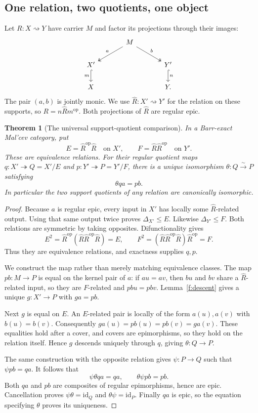\documentclass[11pt]{article}
\newtheorem{theorem}{Theorem}[section]
\theoremstyle{definition}
\theoremstyle{remark}\newtheorem{remark}[theorem]{Remark}
\newcommand{\id}{\mathrm{id}}
\newcommand{\iso}{\xrightarrow{\sim}}
\begin{document}
\subsection{One relation, two quotients, one object}

Let $R:X\rightsquigarrow Y$ have carrier $M$ and factor its projections
through their images:
\[
\begin{tikzcd}[column sep=large]
&M \arrow[dl,two heads,"a"'] \arrow[dr,two heads,"b"]&\\
X' \arrow[d,hook,"m"'] &&Y' \arrow[d,hook,"n"]\\
X&&Y.
\end{tikzcd}
\]
The pair $(a,b)$ is jointly monic. We use $\widehat R:X'\rightsquigarrow Y'$
for the relation on these supports, so $R=n\widehat Rm^{\mathrm{op}}$.
Both projections of $\widehat R$ are regular epic.

\begin{theorem}[The universal support-quotient comparison]\label{d:comparison}
In a Barr-exact Mal'cev category, put
\[
E=\widehat R^{\mathrm{op}}\widehat R
\quad\text{on }X',\qquad
F=\widehat R\widehat R^{\mathrm{op}}
\quad\text{on }Y'.
\]
These are equivalence relations. For their regular quotient maps
$q:X'\twoheadrightarrow Q=X'/E$ and
$p:Y'\twoheadrightarrow P=Y'/F$, there is a unique isomorphism
$\theta:Q\iso P$ satisfying
\[
\theta qa=pb.
\]
In particular the two support quotients of any relation are canonically
isomorphic.
\end{theorem}
\begin{proof}
Because $a$ is regular epic, every input in $X'$ has locally some
$\widehat R$-related output. Using that same output twice proves
$\Delta_{X'}\leq E$. Likewise $\Delta_{Y'}\leq F$. Both relations are
symmetric by taking opposites. Difunctionality gives
\[
E^2=\widehat R^{\mathrm{op}}
 (\widehat R\widehat R^{\mathrm{op}}\widehat R)=E,
\qquad
F^2=(\widehat R\widehat R^{\mathrm{op}}\widehat R)
 \widehat R^{\mathrm{op}}=F.
\]
Thus they are equivalence relations, and exactness supplies $q,p$.

We construct the map rather than merely matching equivalence classes.
The map $pb:M\to P$ is equal on the kernel pair of $a$: if $au=av$,
then $bu$ and $bv$ share a $\widehat R$-related input, so they are
$F$-related and $pbu=pbv$. Lemma~\ref{f:descent} gives a unique
$g:X'\to P$ with $ga=pb$.

Next $g$ is equal on $E$. An $E$-related pair is locally of the form
$a(u),a(v)$ with $b(u)=b(v)$. Consequently
$ga(u)=pb(u)=pb(v)=ga(v)$. These equalities hold after a cover,
and covers are epimorphisms, so they hold on the relation itself.
Hence $g$ descends uniquely through $q$, giving $\theta:Q\to P$.

The same construction with the opposite relation gives $\psi:P\to Q$
such that $\psi pb=qa$. It follows that
\[
\psi\theta qa=qa,\qquad \theta\psi pb=pb.
\]
Both $qa$ and $pb$ are composites of regular epimorphisms, hence are
epic. Cancellation proves $\psi\theta=\id_Q$ and
$\theta\psi=\id_P$. Finally $qa$ is epic, so the equation specifying
$\theta$ proves its uniqueness.
\end{proof}
\end{document}
